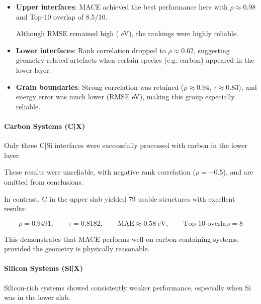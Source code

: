 
\begin{itemize}
  \item \textbf{Upper interfaces}: MACE achieved the best performance here with $\rho \approx 0.98$ and Top-10 overlap
  of 8.5/10.

  Although RMSE remained high ( eV), the rankings were highly reliable.
  \item \textbf{Lower interfaces}: Rank correlation dropped to $\rho \approx 0.62$, suggesting geometry-related
  artefacts when certain species (e.g. carbon) appeared in the lower layer.
  \item \textbf{Grain boundaries}: Strong correlation was retained ($\rho \approx 0.94$, $\tau \approx 0.83$), and
  energy error was much lower (RMSE  eV), making this group especially reliable.
\end{itemize}


\paragraph{Carbon Systems (C|X)}


Only three C|Si interfaces were successfully processed with carbon in the lower layer.

These results were unreliable, with negative rank correlation ($\rho = -0.5$), and are omitted from conclusions.

In contrast, C in the upper slab yielded 79 usable structures with excellent results:


\[
\rho = 0.9491, \qquad \tau = 0.8182, \qquad \text{MAE} \approx 0.58~\text{eV}, \qquad \text{Top-10 overlap} = 8
\]


This demonstrates that MACE performs well on carbon-containing systems, provided the geometry is physically reasonable.


\paragraph{Silicon Systems (Si|X)}


Silicon-rich systems showed consistently weaker performance, especially when Si was in the lower slab.

